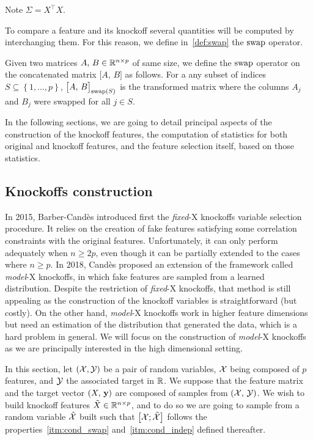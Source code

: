 Note $\Sigma = X^\top X$.

To compare a feature and its knockoff several quantities will be computed by interchanging them.
For this reason, we define in~\ref{def:swap} the $\operatorname{swap}$ operator.
\begin{definition}\label{def:swap}
    Given two matrices $A,\,B \in \mathbb{R}^{n \times p}$ of same size,
    we define the $\operatorname{swap}$ operator on the concatenated matrix $\big[ A,\, B \big]$ as follows.
    For a any subset of indices $S \subseteq \left\{ 1, \dots, p \right\}$,
    $\big[ A,\, B \big]_{\operatorname{swap}(S)}$ is the transformed matrix where the columns $A_j$ and $B_j$ were swapped for all
    $j \in S$.
\end{definition}

In the following sections, we are going to detail principal aspects of the construction of the knockoff features,
the computation of statistics for both original and knockoff features,
and the feature selection itself, based on those statistics.

\subsection{Knockoffs construction}\label{subsec:kc}

In 2015, Barber-Candès introduced first the \textit{fixed}-X knockoffs variable selection procedure.
It relies on the creation of fake features satisfying some correlation constraints with the original features.
Unfortunately, it can only perform adequately when $n \geq 2p$,
even though it can be partially extended to the cases where $n \geq p$.
In 2018, Candès proposed an extension of the framework called \textit{model}-X knockoffs,
in which fake features are sampled from a learned distribution.
Despite the restriction of \textit{fixed}-X knockoffs, that method is still appealing as the construction of the
knockoff variables is straightforward (but costly).
On the other hand, \textit{model}-X knockoffs work in higher feature dimensions
but need an estimation of the distribution that generated the data,
which is a hard problem in general.
We will focus on the construction of \textit{model}-X knockoffs as we are principally interested in the
high dimensional setting.

In this section, let $(\mathcal{X}, \mathcal{Y})$ be a pair of random variables,
$\mathcal{X}$ being composed of $p$ features,
and $\mathcal{Y}$ the associated target in $\mathbb{R}$.
We suppose that the feature matrix and the target vector $(X,\, \mathbf{y})$ are composed of samples from $(\mathcal{X},\, \mathcal{Y})$.
We wish to build knockoff features $\tilde{X} \in \mathbb{R}^{n \times p}$, and to do so we are going to sample from a
random variable $\tilde{\mathcal{X}}$ built such that $\big[ \mathcal{X}; \tilde{\mathcal{X}} \big]$
follows the properties~\ref{itm:cond_swap} and~\ref{itm:cond_indep} defined thereafter.

